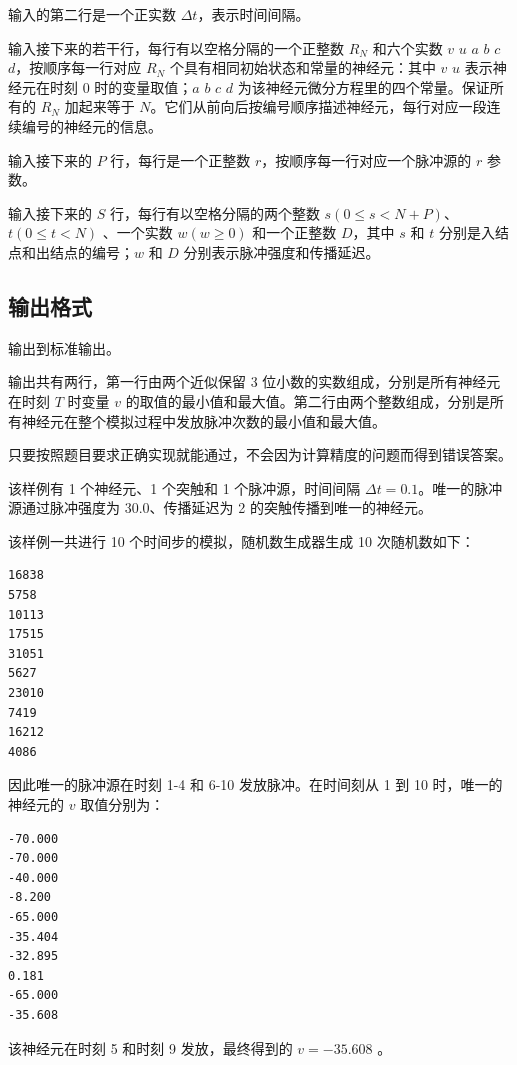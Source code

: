 输入的第二行是一个正实数 $\Delta{t}$，表示时间间隔。

输入接下来的若干行，每行有以空格分隔的一个正整数 $R_N$ 和六个实数 $v$ $u$ $a$ $b$ $c$ $d$，按顺序每一行对应 $R_N$ 个具有相同初始状态和常量的神经元：其中 $v$ $u$ 表示神经元在时刻 0 时的变量取值；$a$ $b$ $c$ $d$ 为该神经元微分方程里的四个常量。保证所有的 $R_N$ 加起来等于 $N$。它们从前向后按编号顺序描述神经元，每行对应一段连续编号的神经元的信息。

输入接下来的 $P$ 行，每行是一个正整数 $r$，按顺序每一行对应一个脉冲源的 $r$ 参数。

输入接下来的 $S$ 行，每行有以空格分隔的两个整数 $s(0 \le s < N+P)$、$t(0 \le t < N)$ 、一个实数 $w(w \ge 0)$ 和一个正整数 $D$，其中 $s$ 和 $t$ 分别是入结点和出结点的编号；$w$ 和 $D$ 分别表示脉冲强度和传播延迟。

\subsection*{输出格式}

输出到标准输出。

输出共有两行，第一行由两个近似保留 3 位小数的实数组成，分别是所有神经元在时刻 $T$ 时变量 $v$ 的取值的最小值和最大值。第二行由两个整数组成，分别是所有神经元在整个模拟过程中发放脉冲次数的最小值和最大值。

只要按照题目要求正确实现就能通过，不会因为计算精度的问题而得到错误答案。

\examplebox*{}{}

该样例有 1 个神经元、1 个突触和 1 个脉冲源，时间间隔 $\Delta{t}=0.1$。唯一的脉冲源通过脉冲强度为 30.0、传播延迟为 2 的突触传播到唯一的神经元。

该样例一共进行 10 个时间步的模拟，随机数生成器生成 10 次随机数如下：

\begin{lstlisting}
16838
5758
10113
17515
31051
5627
23010
7419
16212
4086
\end{lstlisting}

因此唯一的脉冲源在时刻 1-4 和 6-10 发放脉冲。在时间刻从 1 到 10 时，唯一的神经元的 $v$ 取值分别为：

\begin{lstlisting}
-70.000
-70.000
-40.000
-8.200
-65.000
-35.404
-32.895
0.181
-65.000
-35.608
\end{lstlisting}

该神经元在时刻 5 和时刻 9 发放，最终得到的 $v=-35.608$ 。

